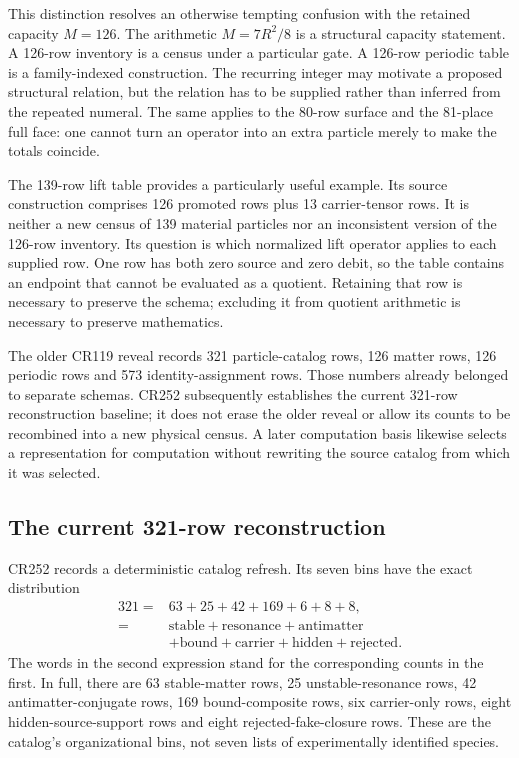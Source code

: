 This distinction resolves an otherwise tempting confusion with the retained capacity $M=126$. The arithmetic $M=7R^2/8$ is a structural capacity statement. A 126-row inventory is a census under a particular gate. A 126-row periodic table is a family-indexed construction. The recurring integer may motivate a proposed structural relation, but the relation has to be supplied rather than inferred from the repeated numeral. The same applies to the 80-row surface and the 81-place full face: one cannot turn an operator into an extra particle merely to make the totals coincide.

The 139-row lift table provides a particularly useful example. Its source construction comprises 126 promoted rows plus 13 carrier-tensor rows. It is neither a new census of 139 material particles nor an inconsistent version of the 126-row inventory. Its question is which normalized lift operator applies to each supplied row. One row has both zero source and zero debit, so the table contains an endpoint that cannot be evaluated as a quotient. Retaining that row is necessary to preserve the schema; excluding it from quotient arithmetic is necessary to preserve mathematics.

The older CR119 reveal records 321 particle-catalog rows, 126 matter rows, 126 periodic rows and 573 identity-assignment rows. Those numbers already belonged to separate schemas. CR252 subsequently establishes the current 321-row reconstruction baseline; it does not erase the older reveal or allow its counts to be recombined into a new physical census. A later computation basis likewise selects a representation for computation without rewriting the source catalog from which it was selected.

\subsection{The current 321-row reconstruction}

CR252 records a deterministic catalog refresh. Its seven bins have the exact distribution
\begin{equation}
\begin{split}
321={}&63+25+42+169+6+8+8,\\
={}&\text{stable}+\text{resonance}+\text{antimatter}\\
 &+\text{bound}+\text{carrier}+\text{hidden}+\text{rejected}.
\end{split}
\label{v2c2:census}
\end{equation}
The words in the second expression stand for the corresponding counts in the first. In full, there are 63 stable-matter rows, 25 unstable-resonance rows, 42 antimatter-conjugate rows, 169 bound-composite rows, six carrier-only rows, eight hidden-source-support rows and eight rejected-fake-closure rows. These are the catalog's organizational bins, not seven lists of experimentally identified species.

